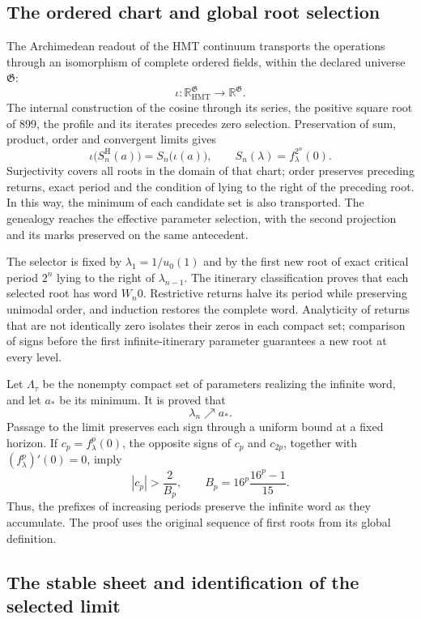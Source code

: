 \subsection{The ordered chart and global root selection}

The Archimedean readout of the HMT continuum transports the operations
through an isomorphism of complete ordered fields, within the declared
universe \(\mathfrak G\):
\[
\iota:\mathbb R_{\mathrm{HMT}}^{\mathfrak G}
\longrightarrow\mathbb R^{\mathfrak G}.
\]
The internal construction of the cosine through its series, the positive square root of 899,
the profile and its iterates precedes zero selection. Preservation
of sum, product, order and convergent limits gives
\[
\iota\bigl(S_n^{\mathrm H}(a)\bigr)=S_n\bigl(\iota(a)\bigr),
\qquad S_n(\lambda)=f_\lambda^{2^n}(0).
\]
Surjectivity covers all roots in the domain of that chart; order
preserves preceding returns, exact period and the condition of
lying to the right of the preceding root. In this way,
the minimum of each candidate set is also transported. The genealogy reaches
the effective parameter selection, with the second projection and its
marks preserved on the same antecedent.

The selector is fixed by \(\lambda_1=1/u_0(1)\) and by the first
new root of exact critical period \(2^n\) lying to the right of
\(\lambda_{n-1}\). The itinerary classification proves that each selected
root has word \(W_n0\). Restrictive returns halve its
period while preserving unimodal order, and induction restores
the complete word. Analyticity of returns that are not identically zero
isolates their zeros in each compact set;
comparison of signs before the first infinite-itinerary parameter
guarantees a new root at every level.

Let \(\Lambda_\tau\) be the nonempty compact set of parameters realizing
the infinite word, and let \(a_*\) be its minimum. It is proved that
\[
\lambda_n\nearrow a_*.
\]
Passage to the limit preserves each sign through a uniform bound at a fixed
horizon. If \(c_p=f_\lambda^p(0)\), the opposite signs of \(c_p\) and
\(c_{2p}\), together with \((f_\lambda^p)'(0)=0\), imply
\[
|c_p|>\frac2{B_p},\qquad
B_p=16^p\frac{16^p-1}{15}.
\]
Thus, the prefixes of increasing periods preserve the infinite word as
they accumulate. The proof uses the original sequence of first roots from
its global definition.

\subsection{The stable sheet and identification of the selected limit}

